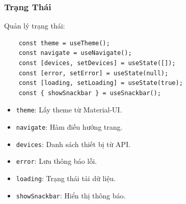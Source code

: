             \subsubsection{Trạng Thái}
                \hspace*{0.6cm}Quản lý trạng thái:
                \begin{lstlisting}
    const theme = useTheme();
    const navigate = useNavigate();
    const [devices, setDevices] = useState([]);
    const [error, setError] = useState(null);
    const [loading, setLoading] = useState(true);
    const { showSnackbar } = useSnackbar();
                \end{lstlisting}
                \begin{itemize}
                    \item \texttt{theme}: Lấy theme từ Material-UI.
                    \item \texttt{navigate}: Hàm điều hướng trang.
                    \item \texttt{devices}: Danh sách thiết bị từ API.
                    \item \texttt{error}: Lưu thông báo lỗi.
                    \item \texttt{loading}: Trạng thái tải dữ liệu.
                    \item \texttt{showSnackbar}: Hiển thị thông báo.
                \end{itemize}

